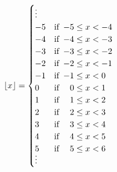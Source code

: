 \documentclass{ximera}
\begin{document}
\begin{example}
\begin{explanation}
$ \lfloor x \rfloor = \begin{cases} 
\vdots & \\
-5 & \text{if $\,-5 \leq x < -4$} \\
-4 & \text{if $\,-4 \leq x < -3$} \\
-3 & \text{if $\,-3 \leq x < -2$} \\
-2 & \text{if $\,-2 \leq x < -1$} \\
-1 & \text{if $\,-1 \leq x < 0$} \\
0 & \text{if $\,\hphantom{-}0 \leq x < 1$} \\
1 & \text{if $\,\hphantom{-}1 \leq x < 2$} \\
2 & \text{if $\,\hphantom{-}2 \leq x < 3$} \\
3 & \text{if $\,\hphantom{-}3 \leq x < 4$} \\
4 & \text{if $\,\hphantom{-}4 \leq x < 5$} \\
5 & \text{if $\,\hphantom{-}5 \leq x < 6$} \\ 
\smash{\vdots} & \end{cases} $





\end{explanation}
\end{example}
\end{document}

